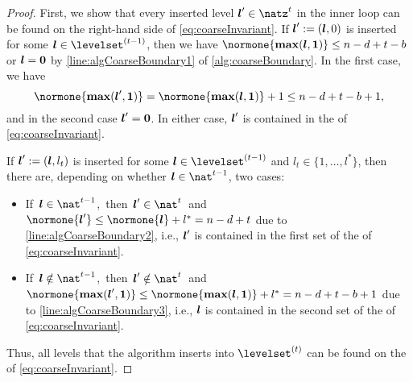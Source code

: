 \propInvariantCoarseBoundary*

\begin{proof}
  First, we show that every inserted level $\*l' \in \natz^t$ in the inner loop
  can be found on the right-hand side of \eqref{eq:coarseInvariant}.
  If ${\boldsymbol{l}}' := ({\boldsymbol{l}}, 0)$
  is inserted for some $\*l \in \levelset^{(t-1)}$,
  then we have $\normone{\vecmax(\*l, \*1)} \le n-d+t-b$ or
  ${\boldsymbol{l}} = {\boldsymbol{0}}$ by \cref{line:algCoarseBoundary1} of
  \cref{alg:coarseBoundary}.
  In the first case, we have
  \begin{equation}
    \normone{\vecmax(\*l', \*1)}
    = \normone{\vecmax(\*l, \*1)} + 1
    \le n - d + t - b + 1,
  \end{equation}
  and in the second case ${\boldsymbol{l}}' = {\boldsymbol{0}}$.
  In either case, ${\boldsymbol{l}}'$ is contained in the \rhs of
  \eqref{eq:coarseInvariant}.
  
  If ${\boldsymbol{l}}' := ({\boldsymbol{l}}, l_t)$ is inserted
  for some $\*l \in \levelset^{(t-1)}$ and
  $l_t \in \{1, \dotsc, l^\ast\}$, then there are,
  depending on whether $\*l \in \nat^{t-1}$, two cases:
  \begin{itemize}
    \item
    \mbox{If $\*l \in \nat^{t-1}$, then $\*l' \in \nat^t$ and}
    $\normone{\*l'} \le \normone{\*l} + l^\ast = n - d + t$
    due to \cref{line:algCoarseBoundary2},
    i.e., ${\boldsymbol{l}}'$ is contained in the first set of the \rhs of
    \eqref{eq:coarseInvariant}.
    
    \item
    \mbox{If $\*l \notin \nat^{t-1}$, then $\*l' \notin \nat^t$ and}
    $\normone{\vecmax(\*l', \*1)}
    \le \normone{\vecmax(\*l, \*1)} + l^\ast
    = n - d + t - b + 1$
    due to \cref{line:algCoarseBoundary3},
    i.e., ${\boldsymbol{l}}$ is contained in the second set of the \rhs of
    \eqref{eq:coarseInvariant}.
  \end{itemize}
  Thus, all levels that the algorithm inserts into $\levelset^{(t)}$
  can be found on the \rhs of \eqref{eq:coarseInvariant}.
  

\end{proof}
